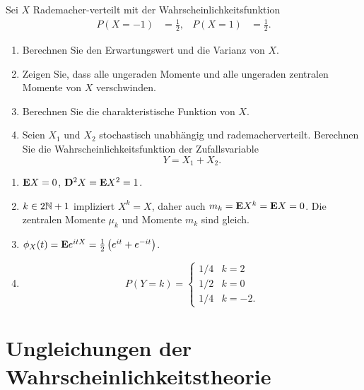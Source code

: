  Sei $X$ Rademacher-verteilt mit der
Wahrscheinlichkeitsfunktion
\begin{align*}
    P(X=-1) &= \frac{1}{2}, & P(X=1)& = \frac{1}{2}.
\end{align*}
\begin{enumerate}
    \item Berechnen Sie den Erwartungswert und die Varianz von $X$. 

    \item Zeigen Sie, dass alle ungeraden Momente und alle ungeraden zentralen
        Momente von $X$ verschwinden. 

    \item Berechnen Sie die charakteristische Funktion von $X$. 

    \item Seien $X_1$ und $X_2$ stochastisch unabhängig und rademacherverteilt.
        Berechnen Sie die Wahrscheinlichkeitsfunktion der Zufallsvariable
        \begin{equation*}
            Y = X_1 + X_2.
        \end{equation*}
\end{enumerate}

\solution
\begin{enumerate}
    \item $\mathbf E X= 0$, $\mathbf D^2 X = \mathbf E X^2 = 1$.
    \item $k\in 2\mathbb N+1$ impliziert $X^k= X$, daher auch $m_{k} = \mathbf E X^k = \mathbf E
        X=0$. Die zentralen Momente $\mu_k$ und Momente $m_{k}$ sind gleich. 
    \item $\phi_{X}(t) = \mathbf E e^{i t X} = \frac{1}{2} \left(  e^{it} + e^{-it} \right)$.
    \item \begin{equation*}
            P(Y=k) =
            \begin{cases}
                1/4 & k=2 \\
                1/2 & k=0 \\
                1/4 & k=-2.
            \end{cases}
        \end{equation*}
\end{enumerate}


\section{Ungleichungen der Wahrscheinlichkeitstheorie}

